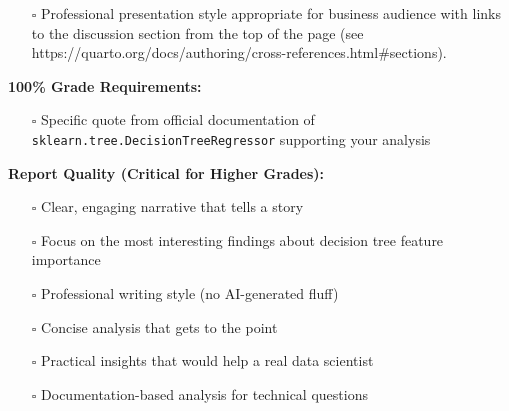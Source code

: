 \documentclass[
  letterpaper,
  DIV=11,
  numbers=noendperiod]{scrartcl}
\providecommand{\tightlist}{%
  \setlength{\itemsep}{0pt}\setlength{\parskip}{0pt}}
\begin{document}
\begin{itemize}
\tightlist
\item[$\square$]
  Professional presentation style appropriate for business audience with
  links to the discussion section from the top of the page (see
  https://quarto.org/docs/authoring/cross-references.html\#sections).
\end{itemize}

\textbf{100\% Grade Requirements:}

\begin{itemize}
\tightlist
\item[$\square$]
  Specific quote from official documentation of
  \texttt{sklearn.tree.DecisionTreeRegressor} supporting your analysis
\end{itemize}

\textbf{Report Quality (Critical for Higher Grades):}

\begin{itemize}
\tightlist
\item[$\square$]
  Clear, engaging narrative that tells a story
\item[$\square$]
  Focus on the most interesting findings about decision tree feature
  importance
\item[$\square$]
  Professional writing style (no AI-generated fluff)
\item[$\square$]
  Concise analysis that gets to the point
\item[$\square$]
  Practical insights that would help a real data scientist
\item[$\square$]
  Documentation-based analysis for technical questions
\end{itemize}
\end{document}
